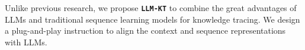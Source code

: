 Unlike previous research, we propose \texttt{\textbf{LLM-KT}} to combine the great advantages of LLMs and traditional sequence learning models for knowledge tracing. 
We design a plug-and-play instruction to align the context and sequence representations with LLMs.




